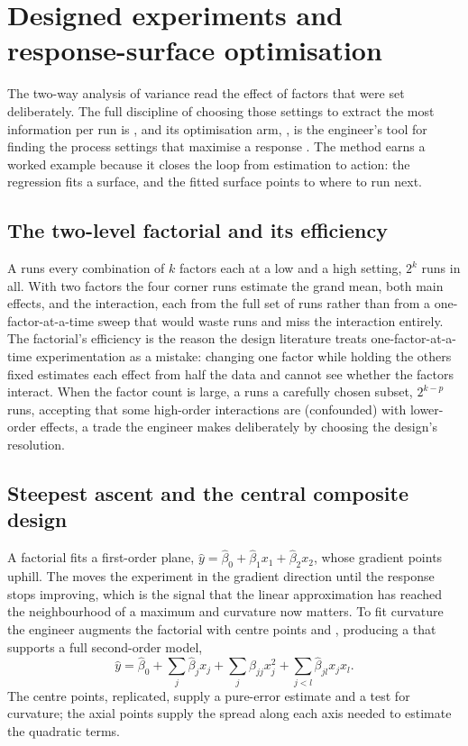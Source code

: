 \section{Designed experiments and response-surface optimisation}

The two-way analysis of variance read the effect of factors that were
set deliberately. The full discipline of choosing those settings to
extract the most information per run is , and its optimisation arm, , is the engineer's tool for finding the process settings
that maximise a response \cite[ch.~11]{text:montgomery-doe-2019}. The
method earns a worked example because it closes the loop from
estimation to action: the regression fits a surface, and the fitted
surface points to where to run next.

\subsection{The two-level factorial and its efficiency}

A  runs every combination of $k$
factors each at a low and a high setting, $2^{k}$ runs in all. With
two factors the four corner runs estimate the grand mean, both main
effects, and the interaction, each from the full set of runs rather
than from a one-factor-at-a-time sweep that would waste runs and miss
the interaction entirely. The factorial's efficiency is the reason the
design literature treats one-factor-at-a-time experimentation as a
mistake: changing one factor while holding the others fixed estimates
each effect from half the data and cannot see whether the factors
interact. When the factor count is large, a  runs a carefully chosen subset, $2^{k-p}$ runs, accepting
that some high-order interactions are  (confounded)
with lower-order effects, a trade the engineer makes deliberately by
choosing the design's resolution.

\subsection{Steepest ascent and the central composite design}

A factorial fits a first-order plane, $\hat{y} = \hat{\beta}_{0} +
\hat{\beta}_{1}x_{1} + \hat{\beta}_{2}x_{2}$, whose gradient points
uphill. The  moves the experiment
in the gradient direction until the response stops improving, which is
the signal that the linear approximation has reached the neighbourhood
of a maximum and curvature now matters. To fit curvature the engineer
augments the factorial with centre points and ,
producing a  that supports a full
second-order model,
\[
\hat{y} = \hat{\beta}_{0} + \sum_{j}\hat{\beta}_{j}x_{j}
+ \sum_{j}\hat{\beta}_{jj}x_{j}^{2}
+ \sum_{j<l}\hat{\beta}_{jl}x_{j}x_{l}.
\]
The centre points, replicated, supply a pure-error estimate and a
test for curvature; the axial points supply the spread along each axis
needed to estimate the quadratic terms.

